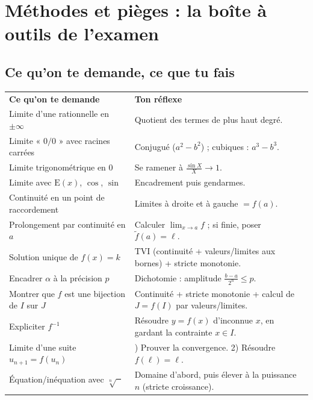 \documentclass[11pt,a4paper]{article}
\newcommand{\E}{\mathrm{E}}
\begin{document}
\section{Méthodes et pièges : la boîte à outils de l'examen}

\subsection{Ce qu'on te demande, ce que tu fais}

\begin{center}
\renewcommand{\arraystretch}{1.45}
\sffamily\small
\begin{tabular}{>{\raggedright\arraybackslash}p{7.2cm} >{\raggedright\arraybackslash}p{8cm}}
\rowcolor{qtealdark} \color{white}\bfseries Ce qu'on te demande & \color{white}\bfseries Ton réflexe \\
\rowcolor{tealpale} Limite d'une rationnelle en $\pm\infty$ & Quotient des termes de plus haut degré. \\
Limite « $0/0$ » avec racines carrées & Conjugué ($a^2 - b^2$) ; cubiques : $a^3 - b^3$. \\
\rowcolor{tealpale} Limite trigonométrique en $0$ & Se ramener à $\frac{\sin X}{X} \to 1$. \\
Limite avec $\E(x)$, $\cos$, $\sin$ & Encadrement puis gendarmes. \\
\rowcolor{tealpale} Continuité en un point de raccordement & Limites à droite et à gauche $= f(a)$. \\
Prolongement par continuité en $a$ & Calculer $\lim_{x \to a} f$ ; si finie, poser $\tilde{f}(a) = \ell$. \\
\rowcolor{tealpale} Solution unique de $f(x) = k$ & TVI (continuité + valeurs/limites aux bornes) + stricte monotonie. \\
Encadrer $\alpha$ à la précision $p$ & Dichotomie : amplitude $\frac{b - a}{2^n} \leq p$. \\
\rowcolor{tealpale} Montrer que $f$ est une bijection de $I$ sur $J$ & Continuité + stricte monotonie + calcul de $J = f(I)$ par valeurs/limites. \\
Expliciter $f^{-1}$ & Résoudre $y = f(x)$ d'inconnue $x$, en gardant la contrainte $x \in I$. \\
\rowcolor{tealpale} Limite d'une suite $u_{n+1} = f(u_n)$ & 1) Prouver la convergence. 2) Résoudre $f(\ell) = \ell$. \\
Équation/inéquation avec $\sqrt[n]{\phantom{x}}$ & Domaine d'abord, puis élever à la puissance $n$ (stricte croissance). \\
\end{tabular}
\end{center}
\end{document}
